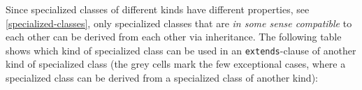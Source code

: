 Since specialized classes of different kinds have different properties, see \cref{specialized-classes}, only specialized classes that are \emph{in some sense compatible} to each other can be derived from each other via inheritance.
The following table shows which kind of specialized class can be used in an \lstinline!extends!-clause of another kind of specialized class (the grey cells mark the few exceptional cases, where a specialized class can be derived from a specialized class of another kind):
\begin{center}
\ifpdf{}
\end{center}
